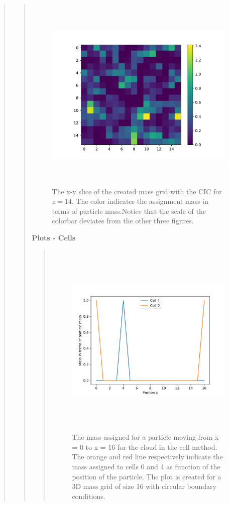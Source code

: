 \begin{quote}
\begin{quote}
\begin{figure}[!ht]
\centering
\includegraphics[width=14cm, height=9.5cm]{./Plots/5c_slice_14.pdf}
\caption{The x-y slice of the created mass grid with the CIC for $z = 14$. The color indicates the assignment mass in terms of particle mass.Notice that the scale of the colorbar deviates from the other three figures. }
\end{figure}
\newpage

\textbf{Plots - Cells}
\begin{quote}
\begin{figure}[!ht]
\centering
\includegraphics[width=14cm, height=9.5cm]{./Plots/5c_cell.pdf}
\caption{The mass assigned for a particle moving from x = 0 to x = 16 for the cloud in the cell method. The orange and red line respectively indicate the mass assigned to cells 0 and 4 as function of the position of the particle. The plot is created for a 3D  mass grid of size 16 with circular boundary conditions.  }
\end{figure}

\end{quote}
\end{quote}
\end{quote}











